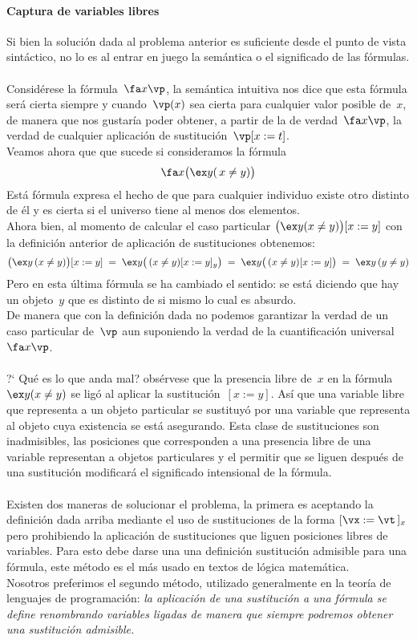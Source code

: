 \documentclass[11pt,letterpaper]{article}
\begin{document}
 \paragraph{Captura de variables libres}
  Si bien la solución dada al problema anterior es suficiente desde el punto 
  de vista sintáctico, no lo es al entrar en juego la semántica o el 
  significado de las fórmulas.\\ \\
  Consid\'erese la f\'ormula~$\fa x\vp$, la semántica intuitiva nos dice que 
  esta fórmula será cierta siempre y cuando~$\vp(x)$ sea cierta para cualquier 
  valor posible de~$x$, de manera que nos gustar\'ia poder obtener, a partir de 
  la de verdad~$\fa x\vp$, la verdad de cualquier aplicación de 
  sustitución~$\vp[x:=t]$. \\
  Veamos ahora que que sucede si consideramos la f\'ormula 
  \[\fa x\big(\ex   y(\,x\neq y)\big)\]  
  Est\'a f\'ormula expresa el hecho de que para cualquier individuo existe otro 
  distinto de \'el y es cierta si el universo tiene al menos dos elementos. \\
  Ahora bien, al momento de calcular el caso particular 
  $\big(\ex y(x\neq y)\big)[x:=y]$ con la definición anterior de aplicación de 
  sustituciones obtenemos:
  \[ 
  \big(\ex y\,(x\neq y)\big)[x:=y] \;= \;
  \ex y\big(\,(x\neq y)[x:=y]_y\big) \; =  \;
  \ex y\big(\,(x\neq y)[x:=y]\big) \; =\;
  \ex y\,(y\neq y)
  \]  
  Pero en esta última fórmula se ha cambiado el sentido: se está diciendo que 
  hay un objeto~$y$ que es distinto de si mismo lo cual es absurdo. \\
  De manera que con la definición dada no podemos garantizar la verdad de un 
  caso particular de~$\vp$ aun suponiendo la verdad de la cuantificación 
  universal~$\fa x\vp$.\\\\
  ?` Qu\'e es lo que anda mal? obs\'ervese que la presencia libre de~$x$ en la 
  f\'ormula~$\ex y(x\neq y)$ se ligó al aplicar la sustituci\'on~$[x:=y]$. 
  Así que una variable libre que representa a un objeto particular se sustituyó 
  por una variable que representa al objeto cuya existencia se está asegurando. 
  Esta clase de sustituciones son inadmisibles, las posiciones que corresponden 
  a una presencia libre de una variable representan a objetos particulares y el
  permitir que se liguen después de una sustitución modificará el significado 
  intensional de la fórmula. \\\\
  Existen dos maneras de solucionar el problema, la primera es aceptando la 
  definición dada arriba mediante el uso de sustituciones de la forma
  $[\vx:=\vt\,]_x$ pero prohibiendo la aplicación de
  sustituciones que liguen posiciones libres de variables. Para esto
  debe darse una una definición sustitución admisible para una fórmula, este 
  método es el más usado en textos de lógica matemática.\\
  Nosotros preferimos el segundo método, utilizado generalmente en la teoría de 
  lenguajes de programación: \textit{la aplicación de una sustitución a una 
  fórmula se  define renombrando variables ligadas de manera que siempre 
  podremos obtener  una sustitución admisible.}
  
\end{document}
